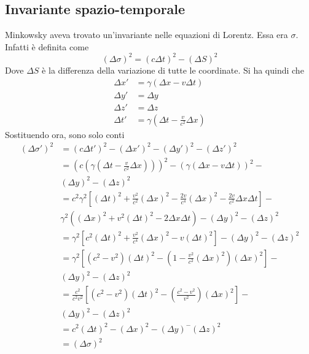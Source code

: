 \subsection{Invariante spazio-temporale}
Minkowsky aveva trovato un'invariante nelle equazioni di Lorentz. Essa era $\sigma$. Infatti è
definita come
\begin{equation*}
  {(\Delta\sigma)}^2={(c\Delta t)}^2-{(\Delta S)}^2
\end{equation*}
Dove $\Delta S$ è la differenza della variazione di tutte le coordinate. Si ha quindi che
\begin{align*}
  \Delta x' &= \gamma(\Delta x-v\Delta t)\\
  \Delta y' &= \Delta y\\
  \Delta z' &= \Delta z\\
  \Delta t' &= \gamma \left( \Delta t-\frac{v}{c^2}\Delta x \right)
\end{align*}
Sostituendo ora, sono solo conti
\begin{align*}
  {(\Delta\sigma')}^2 
  &= {(c\Delta t')}^2-{(\Delta x')}^2-{(\Delta y')}^2-{(\Delta z')}^2\\
  &= {\left(c\left(\gamma \left( \Delta t-\frac{v}{c^2}\Delta x \right)\right)\right)}^2-
  {\left( \gamma \left( \Delta x-v\Delta t \right) \right)}^2-\\
  &{(\Delta y)}^2-{(\Delta z)}^2\\
  &= c^2\gamma^2 \left[ {(\Delta t)}^2+\frac{v^2}{c^2}{(\Delta x)}^2-\frac{2v}{c^4}{(\Delta x)}^2 -
  \frac{2v}{c^2}\Delta x\Delta t\right]-\\
  &\gamma^2({(\Delta x)}^2+v^2{(\Delta t)}^2-2\Delta x\Delta t)-{(\Delta y)}^2-{(\Delta z)}^2\\
  &=\gamma^2 \left[ c^2{(\Delta t)}^2+\frac{v^2}{c^4}{(\Delta x)}^2-v{(\Delta t)}^2 \right]-
  {(\Delta y)}^2-{(\Delta z)}^2\\
  &=\gamma^2 \left[ (c^2-v^2){(\Delta t)}^2-\left( 1-\frac{v^2}{c^2}
  {(\Delta x)}^2 \right){(\Delta x)}^2 \right]-\\
  &{(\Delta y)}^2-
  {(\Delta z)}^2\\
  &=\frac{c^2}{c^2v^2}\left[ (c^2-v^2){(\Delta t)}^2-\left( \frac{c^2-v^2}{v^2}
  \right){(\Delta x)}^2 \right]-\\
  &{(\Delta y)}^2-{(\Delta z)}^2\\
  &=c^2{(\Delta t)}^2-{(\Delta x)}^2-{(\Delta y)}^-{(\Delta z)}^2\\
  &={(\Delta\sigma)}^2
\end{align*}

